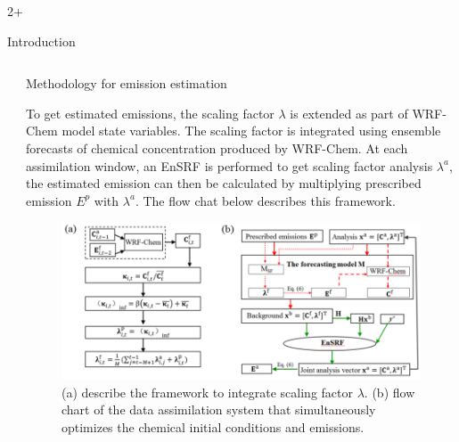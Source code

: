 \documentclass[final]{beamer}
\newlength{\sepwidth}
\newlength{\colwidth}
\newcommand{\separatorcolumn}{\begin{column}{\sepwidth}\end{column}}
\begin{document}
\begin{frame}[t]
\begin{columns}
\begin{column}{2\colwidth+\sepwidth}
\begin{block}{Introduction}
    		
    	\end{block}
    	\end{column}

	\end{columns}

	\begin{columns}[t]
		\separatorcolumn
		
		\begin{column}{\colwidth}
			
			\begin{block}{Methodology for emission estimation}
				
                To get estimated emissions, the scaling factor $\lambda$ is extended as part of WRF-Chem model state variables. The scaling factor is integrated using ensemble forecasts of chemical concentration produced by WRF-Chem. At each assimilation window, an EnSRF is performed to get scaling factor analysis $\lambda^a$, the estimated emission can then be calculated by multiplying prescribed emission $E^p$ with $\lambda^a$. The flow chat below describes this framework.  
 
                \begin{figure}
                    \centerline{\includegraphics[width=30pc,angle=0,scale=2.5]{figure/Methodology.png}}
                    \caption{(a) describe the framework to integrate scaling factor $\lambda$. (b) flow chart of the data assimilation system that simultaneously optimizes the chemical initial
                    conditions and emissions.}\label{fig2}
                \end{figure}

				

\end{block}
\end{column}
\end{columns}
\end{frame}
\end{document}
